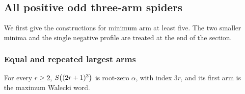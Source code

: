 \subsection{All positive odd three-arm spiders}
\label{construction:all-odd-alpha3}

We first give the constructions for minimum arm at least five. The
two smaller minima and the single negative profile are treated at the
end of the section.

\subsubsection{Equal and repeated largest arms}

\begin{proposition}\label{ok:equal-odd-three}
For every $r\ge2$, $S\!\left((2r+1)^3\right)$ is root-zero $\alpha$, with
index $3r$, and its first arm is the maximum Walecki word.
\end{proposition}
